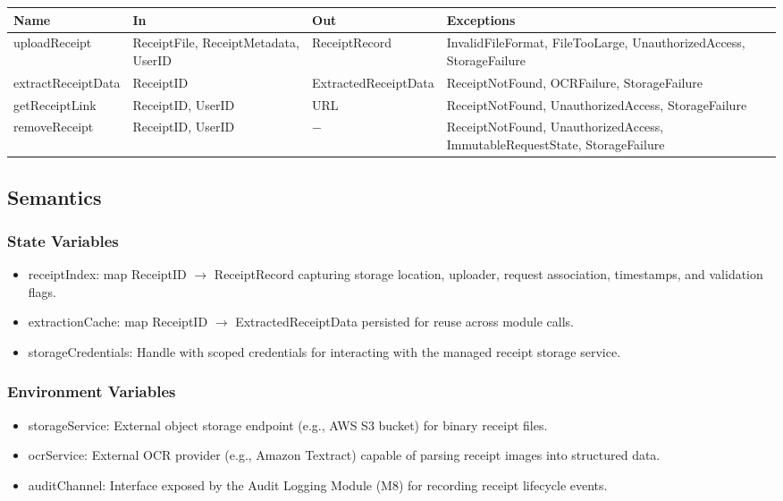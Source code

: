 \documentclass[12pt, titlepage]{article}
\begin{document}
\begin{center}
\begin{tabular}{p{2.8cm} p{4.2cm} p{4.2cm} p{2.4cm}}
\toprule
\textbf{Name} & \textbf{In} & \textbf{Out} & \textbf{Exceptions} \\
\midrule
uploadReceipt & ReceiptFile, ReceiptMetadata, UserID & ReceiptRecord & InvalidFileFormat, FileTooLarge, UnauthorizedAccess, StorageFailure \\
extractReceiptData & ReceiptID & ExtractedReceiptData & ReceiptNotFound, OCRFailure, StorageFailure \\
getReceiptLink & ReceiptID, UserID & URL & ReceiptNotFound, UnauthorizedAccess, StorageFailure \\
removeReceipt & ReceiptID, UserID & $-$ & ReceiptNotFound, UnauthorizedAccess, ImmutableRequestState, StorageFailure \\
\bottomrule
\end{tabular}
\end{center}

\subsection{Semantics}

\subsubsection{State Variables}

\begin{itemize}
  \item receiptIndex: map ReceiptID $\rightarrow$ ReceiptRecord capturing storage location, uploader, request association, timestamps, and validation flags.
  \item extractionCache: map ReceiptID $\rightarrow$ ExtractedReceiptData persisted for reuse across module calls.
  \item storageCredentials: Handle with scoped credentials for interacting with the managed receipt storage service.
\end{itemize}

\subsubsection{Environment Variables}

\begin{itemize}
  \item storageService: External object storage endpoint (e.g., AWS S3 bucket) for binary receipt files.
  \item ocrService: External OCR provider (e.g., Amazon Textract) capable of parsing receipt images into structured data.
  \item auditChannel: Interface exposed by the Audit Logging Module (M8) for recording receipt lifecycle events.
\end{itemize}
\end{document}
